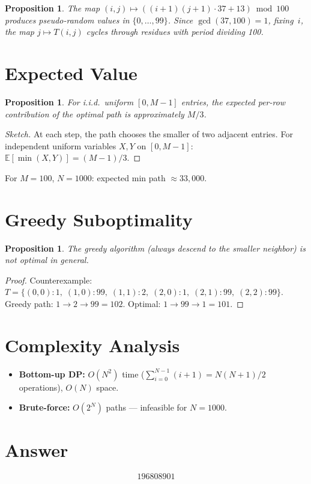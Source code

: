 \documentclass[11pt]{article}
\newtheorem{proposition}[theorem]{Proposition}
\begin{document}
\begin{proposition}
The map $(i,j) \mapsto ((i+1)(j+1)\cdot 37 + 13) \bmod 100$ produces pseudo-random values in $\{0,\ldots,99\}$. Since $\gcd(37, 100) = 1$, fixing~$i$, the map $j \mapsto T(i,j)$ cycles through residues with period dividing 100.
\end{proposition}

\section{Expected Value}

\begin{proposition}
For i.i.d.\ uniform $[0, M-1]$ entries, the expected per-row contribution of the optimal path is approximately $M/3$.
\end{proposition}

\begin{proof}[Sketch]
At each step, the path chooses the smaller of two adjacent entries. For independent uniform variables $X, Y$ on $[0, M-1]$: $\mathbb{E}[\min(X,Y)] = (M-1)/3$.
\end{proof}

For $M = 100$, $N = 1000$: expected min path $\approx 33{,}000$.

\section{Greedy Suboptimality}

\begin{proposition}
The greedy algorithm (always descend to the smaller neighbor) is not optimal in general.
\end{proposition}

\begin{proof}
Counterexample: $T = \{(0,0){:}1,\; (1,0){:}99,\; (1,1){:}2,\; (2,0){:}1,\; (2,1){:}99,\; (2,2){:}99\}$. Greedy path: $1 \to 2 \to 99 = 102$. Optimal: $1 \to 99 \to 1 = 101$.
\end{proof}

\section{Complexity Analysis}

\begin{itemize}
\item \textbf{Bottom-up DP:} $O(N^2)$ time ($\sum_{i=0}^{N-1}(i+1) = N(N+1)/2$ operations), $O(N)$ space.
\item \textbf{Brute-force:} $O(2^N)$ paths --- infeasible for $N = 1000$.
\end{itemize}

\section{Answer}

\[
\boxed{196808901}
\]
\end{document}
